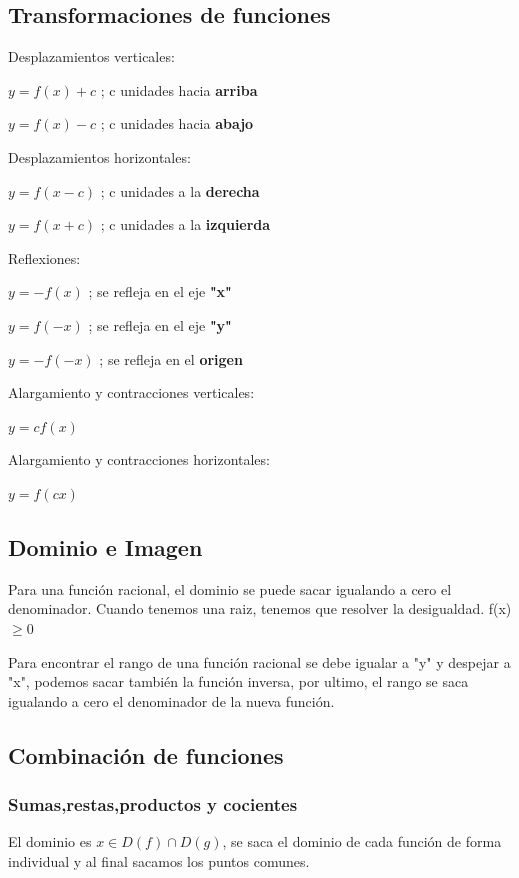 \documentclass[letterpaper,12pt]{article}
\begin{document}
\begin{sloppypar}
\subsection{Transformaciones de funciones}
Desplazamientos verticales:
\begin{center}
    $y = f(x) + c$ ; c unidades hacia \textbf{arriba}

    $y = f(x) - c$ ; c unidades hacia \textbf{abajo}
\end{center}
Desplazamientos horizontales:
\begin{center}
    $y = f(x-c)$ ; c unidades a la \textbf{derecha}

    $y = f(x+c)$ ; c unidades a la \textbf{izquierda}
\end{center}
Reflexiones:
\begin{center}
    $y = -f(x)$ ;  se refleja en el eje \textbf{"x"}

    $y = f(-x)$ ; se refleja en el eje \textbf{"y"}

    $y = -f(-x)$ ; se refleja en el \textbf{origen}
\end{center}
Alargamiento y contracciones verticales:
\begin{center}
    $y = cf(x)$
\end{center}
Alargamiento y contracciones horizontales:
\begin{center}
    $y = f(cx)$
\end{center}
\subsection{Dominio e Imagen}
Para una función racional, el dominio se puede sacar igualando a cero el denominador.
Cuando tenemos una raiz, tenemos que resolver la desigualdad. f(x) $\geq 0$

Para encontrar el rango de una función racional se debe igualar a "y" y despejar a "x", podemos sacar también la función inversa, por ultimo, el rango se saca igualando a cero el denominador de la nueva función.

\subsection{Combinación de funciones}
\subsubsection*{Sumas,restas,productos y cocientes}
El dominio es $x\in D(f)\cap D(g)$, se saca el dominio de cada función de forma individual y al final sacamos los puntos comunes.


\end{sloppypar}
\end{document}

